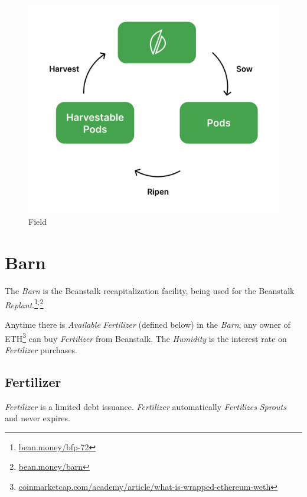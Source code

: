 \documentclass[tikz]{article}
\newcommand{\term}[1]{\textsl{#1}}
\newcommand{\fref}[1]{\footnote{\href{http://#1}{#1}}}
\begin{document}
\begin{figure}[h!]
    \centering
    \includegraphics[scale=.16]{Figure2}
    \vspace*{-5mm}
    \caption{Field}
    \label{fig 2}
\end{figure}


\section{Barn}

The \term{Barn} is the Beanstalk recapitalization facility, being used for the Beanstalk \term{Replant}.\footnote{\href{https://bean.money/bfp-72}{bean.money/bfp-72}}$^{,}$\footnote{\href{https://bean.money/barn}{bean.money/barn}}

Anytime there is \term{Available} \term{Fertilizer} (defined below) in the \term{Barn}, any owner of ETH\fref{coinmarketcap.com/academy/article/what-is-wrapped-ethereum-weth} can buy \term{Fertilizer} from Beanstalk. The \term{Humidity} is the interest rate on \term{Fertilizer} purchases.


\subsection{Fertilizer}

\term{Fertilizer} is a limited debt issuance. \term{Fertilizer} automatically \term{Fertilizes} \term{Sprouts} and never expires.
\end{document}
